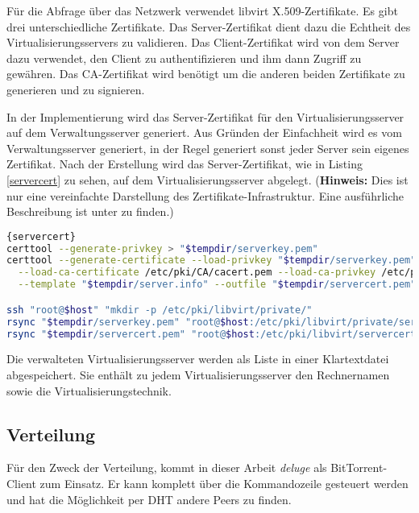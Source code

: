 Für die Abfrage über das Netzwerk verwendet libvirt X.509-Zertifikate. Es gibt drei unterschiedliche Zertifikate. Das Server-Zertifikat dient dazu die Echtheit des Virtualisierungsservers zu validieren. Das Client-Zertifikat wird von dem Server dazu verwendet, den Client zu authentifizieren und ihm dann Zugriff zu gewähren. Das CA-Zertifikat wird benötigt um die anderen beiden Zertifikate zu generieren und zu signieren.

In der Implementierung wird das Server-Zertifikat für den Virtualisierungsserver auf dem Verwaltungsserver generiert. Aus Gründen der Einfachheit wird es vom Verwaltungsserver generiert, in der Regel generiert sonst jeder Server sein eigenes Zertifikat. Nach der Erstellung wird das Server-Zertifikat, wie in Listing \ref{servercert} zu sehen, auf dem Virtualisierungsserver abgelegt. (\textbf{Hinweis:} Dies ist nur eine vereinfachte Darstellung des Zertifikate-Infrastruktur. Eine ausführliche Beschreibung ist unter \cite{libvirttls} zu finden.)
\\
\begin{lstlisting}[caption=Erstellung des Server-Zertifikats für den jeweiligen Virtualisierungsserver (servercert.sh),language=Bash,label=servercert]{servercert}
certtool --generate-privkey > "$tempdir/serverkey.pem"
certtool --generate-certificate --load-privkey "$tempdir/serverkey.pem" \
  --load-ca-certificate /etc/pki/CA/cacert.pem --load-ca-privkey /etc/pki/CA/private/cakey.pem \
  --template "$tempdir/server.info" --outfile "$tempdir/servercert.pem" 2> "/var/log/cow.log"

ssh "root@$host" "mkdir -p /etc/pki/libvirt/private/"
rsync "$tempdir/serverkey.pem" "root@$host:/etc/pki/libvirt/private/serverkey.pem"
rsync "$tempdir/servercert.pem" "root@$host:/etc/pki/libvirt/servercert.pem"
\end{lstlisting}

Die verwalteten Virtualisierungsserver werden als Liste in einer Klartextdatei abgespeichert. Sie enthält zu jedem Virtualisierungsserver den Rechnernamen sowie die Virtualisierungstechnik. \label{vhosts}

\subsection{Verteilung}\label{verteilung}
Für den Zweck der Verteilung, kommt in dieser Arbeit \textit{deluge} als BitTorrent-Client zum Einsatz. Er kann komplett über die Kommandozeile gesteuert werden und hat die Möglichkeit per DHT andere Peers zu finden.

